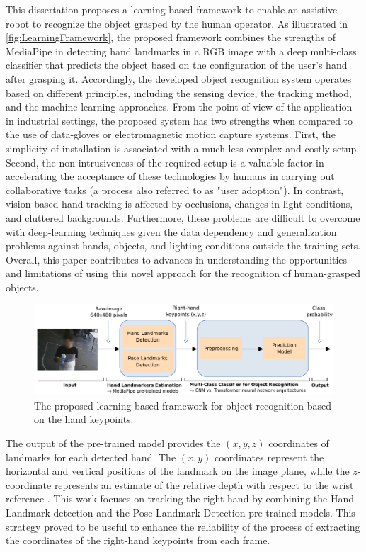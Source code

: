 This dissertation proposes a learning-based framework to enable an assistive robot to recognize the object grasped by the human operator. As illustrated in \autoref{fig:LearningFramework}, the proposed framework combines the strengths of MediaPipe in detecting hand landmarks in a RGB image with a deep multi-class classifier that predicts the object based on the configuration of the user’s hand after grasping it. Accordingly, the developed object recognition system operates based on different principles, including the sensing device, the tracking method, and the machine learning approaches. From the point of view of the application in industrial settings, the proposed system has two strengths when compared to the use of data-gloves or electromagnetic motion capture systems. First, the simplicity of installation is associated with a much less complex and costly setup. Second, the non-intrusiveness of the required setup is a valuable factor in accelerating the acceptance of these technologies by humans in carrying out collaborative tasks (a process also referred to as "user adoption"). In contrast, vision-based hand tracking is affected by occlusions, changes in light conditions, and cluttered backgrounds. Furthermore, these problems are difficult to overcome with deep-learning techniques given the data dependency and generalization problems against hands, objects, and lighting conditions outside the training sets. Overall, this paper contributes to advances in understanding the opportunities and limitations of using this novel approach for the recognition of human-grasped objects.

\begin{figure}[ht]
    \centering
    \includegraphics[width=1\columnwidth]{figs/LearningFrameworkB.pdf}
    \caption{The proposed learning-based framework for object recognition based on the hand keypoints.}
    \label{fig:LearningFramework}
\end{figure}

The output of the pre-trained model provides the $(x,y,z)$ coordinates of landmarks for each detected hand. The $(x,y)$ coordinates represent the horizontal and vertical positions of the landmark on the image plane, while the $z$-coordinate represents an estimate of the relative depth with respect to the wrist reference \cite{Amprimo2023}. This work focuses on tracking the right hand by combining the Hand Landmark detection and the Pose Landmark Detection pre-trained models. This strategy proved to be useful to enhance the reliability of the process of extracting the coordinates of the right-hand keypoints from each frame.

